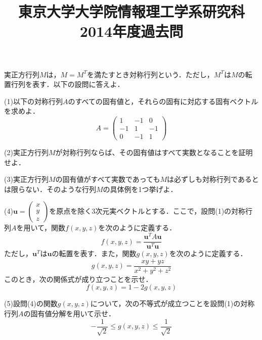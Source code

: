 \documentclass[a4j]{jarticle}
\title{東京大学大学院情報理工学系研究科2014年度過去問}
\author{}
\date{}
\begin{document}
\thispagestyle{empty}
\maketitle
\pagebreak

\section{}

\begin{screen}
 実正方行列$M$は，$M=M^T$を満たすとき対称行列という．ただし，$M^T$は$M$の転置行列を表す．以下の設問に答えよ．
\end{screen}

\begin{screen}
 (1)以下の対称行列$A$のすべての固有値と，それらの固有に対応する固有ベクトルを求めよ．
 $$A=\begin{pmatrix}
    1 & -1 & 0 \\
    -1 & 1 & -1 \\
    0 & -1 & 1
   \end{pmatrix}$$
\end{screen}


\begin{screen}
 (2)実正方行列$M$が対称行列ならば、その固有値はすべて実数となることを証明せよ．
\end{screen}


\begin{screen}
 (3)実正方行列$M$の固有値がすべて実数であっても$M$は必ずしも対称行列であるとは限らない．そのような行列$M$の具体例を1つ挙げよ．
\end{screen}


\begin{screen}
 (4)$\bm{u}=\begin{pmatrix}x \\ y \\ z\end{pmatrix}$を原点を除く3次元実ベクトルとする．ここで，設問(1)の対称行列$A$を用いて，関数$f(x,y,z)$を次のように定義する．
 $$f(x,y,z)=\frac{\bm{u}^TA\bm{u}}{\bm{u}^T\bm{u}}$$
 ただし，$\bm{u}^T$は$\bm{u}$の転置を表す．また，関数$g(x,y,z)$を次のように定義する．
 $$g(x,y,z)=\frac{xy+yz}{x^2+y^2+z^2}$$
 このとき，次の関係式が成り立つことを示せ．
 $$f(x,y,z)=1-2g(x,y,z)$$
\end{screen}


\begin{screen}
 (5)設問(4)の関数$g(x,y,z)$について，次の不等式が成立つことを設問(1)の対称行列$A$の固有値分解を用いて示せ．
 $$-\frac{1}{\sqrt{2}}\leq g(x,y,z) \leq \frac{1}{\sqrt{2}}$$
\end{screen}
\end{document}
